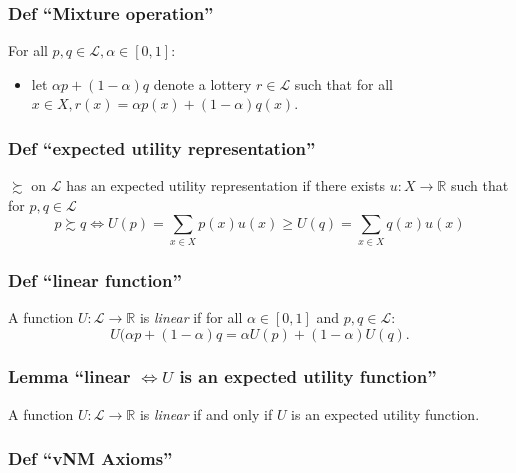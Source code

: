 \documentclass[
]{article}
\providecommand{\tightlist}{%
  \setlength{\itemsep}{0pt}\setlength{\parskip}{0pt}}
\begin{document}
\hypertarget{def-mixture-operation}{%
\subsubsection{Def ``Mixture operation''}\label{def-mixture-operation}}

For all \(p, q \in \mathcal{L}, \alpha \in [0,1]\):

\begin{itemize}
\tightlist
\item
  let \(\alpha p + (1-\alpha)q\) denote a lottery \(r\in \mathcal{L}\)
  such that for all \(x\in X, r(x) = \alpha p(x) + (1-\alpha)q(x)\).
\end{itemize}

\hypertarget{def-expected-utility-representation}{%
\subsubsection{Def ``expected utility
representation''}\label{def-expected-utility-representation}}

\(\succsim\) on \(\mathcal{L}\) has an expected utility representation
if there exists \(u: X \rightarrow \mathbb{R}\) such that for
\(p,q \in \mathcal{L}\)
\[p \succsim q \iff U(p) = \sum_{x\in X} p(x)u(x) \geq U(q) = \sum_{x\in X} q(x)u(x)\]

\hypertarget{def-linear-function}{%
\subsubsection{Def ``linear function''}\label{def-linear-function}}

A function \(U: \mathcal{L} \rightarrow \mathbb{R}\) is \emph{linear} if
for all \(\alpha \in [0,1]\) and \(p,q \in \mathcal{L}\):
\[U(\alpha p + (1-\alpha)q = \alpha U(p) + (1-\alpha) U(q).\]

\hypertarget{lemma-linear-iff-u-is-an-expected-utility-function}{%
\subsubsection{\texorpdfstring{Lemma ``linear \(\iff U\) is an expected
utility
function''}{Lemma ``linear \textbackslash iff U is an expected utility function''}}\label{lemma-linear-iff-u-is-an-expected-utility-function}}

A function \(U: \mathcal{L} \rightarrow \mathbb{R}\) is \emph{linear} if
and only if \(U\) is an expected utility function.

\hypertarget{def-vnm-axioms}{%
\subsubsection{Def ``vNM Axioms''}\label{def-vnm-axioms}}
\end{document}
